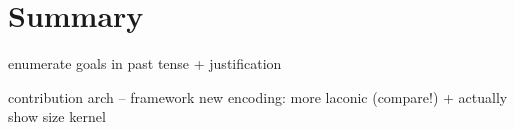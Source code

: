 \chapter{Summary}
\label{ch:summary}

enumerate goals in past tense + justification

contribution
  arch -- framework
  new encoding: more laconic (compare!) + actually show size
  kernel
  
